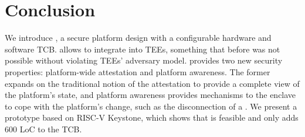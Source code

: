 \section{Conclusion}
\label{sec:conclusion}




We introduce \name, a secure platform design with a configurable hardware and software TCB. \name allows to integrate \sphw into TEEs, something that before was not possible without violating TEEs' adversary model.  
\name provides two new security properties: platform-wide attestation and platform awareness. The former expands on the traditional notion of the attestation to provide a complete view of the platform's state, and platform awareness provides mechanisms to the enclave to cope with the platform's change, such as the disconnection of a \sphw. We present a prototype based on RISC-V Keystone, which shows that \name is feasible and only adds $600$ LoC to the TCB.
